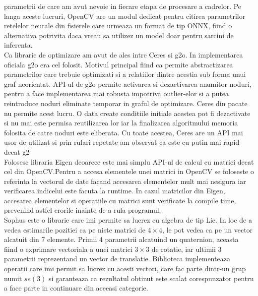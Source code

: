 \documentclass[12pt,a4paper]{report}
\begin{document}
parametrii de care am avut nevoie in fiecare etapa de procesare a cadrelor. Pe langa aceste 
lucruri, OpenCV are un modul dedicat pentru citirea parametrilor retelelor neurale din fisierele care 
urmeaza un format de tip ONNX, fiind o alternativa potrivita daca vreau sa utilizez un model doar 
pentru sarcini de inferenta.  \\
Ca librarie de optimizare am avut de ales intre Ceres si g2o. In implementarea oficiala 
g2o era cel folosit. Motivul principal fiind ca permite abstractizarea parametrilor care 
trebuie optimizati si a relatiilor dintre acestia sub forma unui graf neorientat. 
API-ul de g2o permite activarea si dezactivarea anumitor noduri, pentru a face implementarea 
mai robusta impotriva outlier-elor si a putea reintroduce noduri eliminate temporar in graful 
de optimizare. Ceres din pacate nu permite acest lucru. O data create conditiile initiale acestea 
pot fi dezactivate si nu mai este permisa reutilizarea lor iar la finalizarea algoritmului 
memoria folosita de catre noduri este eliberata. Cu toate acestea, Ceres are un API mai
usor de utilizat si prin rulari repetate am observat ca este cu putin mai rapid decat g2 \\
Folosesc libraria Eigen deoarece este mai simplu API-ul de calcul cu matrici decat 
cel din OpenCV.\@ Pentru a accesa elementele unei matrici in OpenCV se foloseste o referinta la 
vectorul de date facand accesarea elementelor mult mai nesigura iar verificarea indicelui este 
facuta la runtime. In cazul matricilor din Eigen, accesarea elementelor si operatiile
cu matrici sunt verificate la compile time, prevenind astfel erorile inainte de a rula programul. \\
Sophus este o librarie care imi permite sa lucrez cu algebra de tip Lie. In loc de a vedea
estimarile pozitiei ca pe niste matrici de $ 4 \times 4 $, le pot vedea ca pe un vector alcatuit din 7 
elemente. Primii 4 parametrii alcatuind un quaternion, aceasta fiind o exprimare vectoriala 
a unei matrici $ 3 \times 3 $ de rotatie, iar ultimii 3 parametrii reprezentand un vector de translatie.
Biblioteca implementeaza operatii care imi permit sa lucrez cu acesti vectori, care fac parte 
dintr-un grup numit \(se(3)\) si garanteaza ca rezultatul obtinut este scalat corespunzator 
pentru a face parte in continuare din aceeasi categorie. \\
\end{document}
